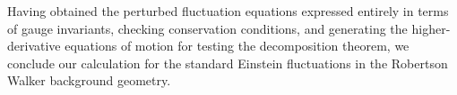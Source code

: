 Having obtained the perturbed fluctuation equations expressed entirely in terms of gauge invariants, checking conservation conditions, and generating the higher-derivative equations of motion for testing the decomposition theorem, we conclude our calculation for the standard Einstein fluctuations in the Robertson Walker background geometry. 